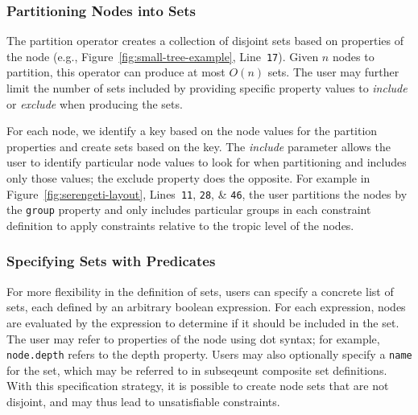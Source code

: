 \subsubsection{Partitioning Nodes into Sets}

The partition operator creates a collection of disjoint sets based on
properties of the node
(e.g., Figure~\ref{fig:small-tree-example}, Line~\texttt{17}).
Given $n$ nodes to partition, this operator can produce at most $O(n)$ 
sets. The user may further limit 
the number of sets included by providing specific property values to 
\emph{include} or \emph{exclude} when producing the sets.

For each node, we identify a key based on the node values for the partition
properties and create sets based on the key. The \emph{include} parameter allows
the user to identify particular node values to look for when partitioning
and includes only those values; the exclude property does the opposite. 
For example in Figure~\ref{fig:serengeti-layout}, Lines~\texttt{11}, \texttt{28},
\& \texttt{46}, the user partitions the nodes by the \texttt{group} property
and only includes particular groups in each constraint definition to apply
constraints relative to the tropic level of the nodes.

\subsubsection{Specifying Sets with Predicates}

For more flexibility in the definition of sets, users
can specify a concrete list of sets, each defined by an arbitrary boolean
expression. For each expression, nodes are evaluated by the expression
to determine if it should be included in the set. The user may
refer to properties of the node using dot syntax; for example,
\texttt{node.depth} refers to the depth property. Users may also optionally 
specify a \texttt{name} for the set, which may be referred to in subseqeunt
composite set definitions. With this specification strategy, it is possible
to create node sets that are not disjoint, and may thus lead to
unsatisfiable constraints.



